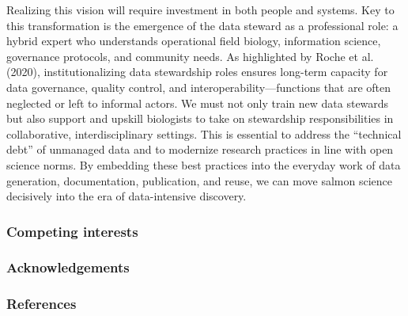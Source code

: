 \documentclass[
  letterpaper,
  DIV=11,
  numbers=noendperiod]{scrartcl}
\begin{document}
Realizing this vision will require investment in both people and
systems. Key to this transformation is the emergence of the data steward
as a professional role: a hybrid expert who understands operational
field biology, information science, governance protocols, and community
needs. As highlighted by Roche et al. (2020), institutionalizing data
stewardship roles ensures long-term capacity for data governance,
quality control, and interoperability---functions that are often
neglected or left to informal actors. We must not only train new data
stewards but also support and upskill biologists to take on stewardship
responsibilities in collaborative, interdisciplinary settings. This is
essential to address the ``technical debt'' of unmanaged data and to
modernize research practices in line with open science norms. By
embedding these best practices into the everyday work of data
generation, documentation, publication, and reuse, we can move salmon
science decisively into the era of data-intensive discovery.

\subsubsection{Competing interests}\label{competing-interests}

\subsubsection{Acknowledgements}\label{acknowledgements}

\subsubsection{References}\label{references}
\end{document}
